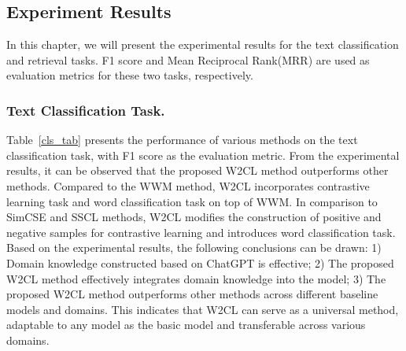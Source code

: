 \subsection{Experiment Results}
In this chapter, we will present the experimental results for the text classification and retrieval tasks. F1 score and Mean Reciprocal Rank(MRR) are used as evaluation metrics for these two tasks, respectively. 
\subsubsection{Text Classification Task.}Table~\ref{cls_tab} presents the performance of various methods on the text classification task, with F1 score as the evaluation metric. From the experimental results, it can be observed that the proposed W2CL method outperforms other methods. Compared to the WWM method, W2CL incorporates contrastive learning task and word classification task on top of WWM. In comparison to SimCSE and SSCL methods, W2CL modifies the construction of positive and negative samples for contrastive learning and introduces word classification task. Based on the experimental results, the following conclusions can be drawn: 1) Domain knowledge constructed based on ChatGPT is effective; 2) The proposed W2CL method effectively integrates domain knowledge into the model; 3) The proposed W2CL method outperforms other methods across different baseline models and domains. This indicates that W2CL can serve as a universal method, adaptable to any model as the basic model and transferable across various domains.

